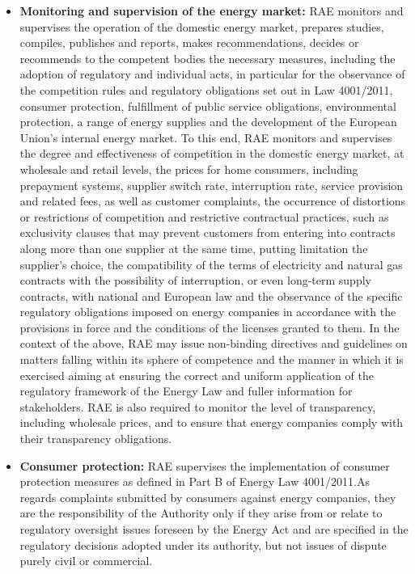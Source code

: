 \begin{itemize}
\item{\textbf{Monitoring and supervision of the energy market:}}
RAE monitors and supervises the operation of the domestic energy market, prepares studies, compiles, publishes and reports, makes recommendations, decides or recommends to the competent bodies the necessary measures, including the adoption of regulatory and individual acts, in particular for the observance of the competition rules and regulatory obligations set out in Law 4001/2011, consumer protection, fulfillment of public service obligations, environmental protection, a range of energy supplies and the development of the European Union's internal energy market. To this end, RAE monitors and supervises the degree and effectiveness of competition in the domestic energy market, at wholesale and retail levels, the prices for home consumers, including prepayment systems, supplier switch rate, interruption rate, service provision and related fees, as well as customer complaints, the occurrence of distortions or restrictions of competition and restrictive contractual practices, such as exclusivity clauses that may prevent customers from entering into contracts along more than one supplier at the same time, putting limitation the supplier’s choice, the compatibility of the terms of electricity and natural gas contracts with the possibility of interruption, or even long-term supply contracts, with national and European law and the observance of the specific regulatory obligations imposed on energy companies in accordance with the provisions in force and the conditions of the licenses granted to them. In the context of the above, RAE may issue non-binding directives and guidelines on matters falling within its sphere of competence and the manner in which it is exercised aiming at ensuring the correct and uniform application of the regulatory framework of the Energy Law and fuller information for stakeholders. RAE is also required to monitor the level of transparency, including wholesale prices, and to ensure that energy companies comply with their transparency obligations.
\item{\textbf{Consumer protection:}}
RAE supervises the implementation of consumer protection measures as defined in Part B of Energy Law 4001/2011.As regards complaints submitted by consumers against energy companies, they are the responsibility of the Authority only if they arise from or relate to regulatory oversight issues foreseen by the Energy Act and are specified in the regulatory decisions adopted under its authority, but not issues of dispute purely civil or commercial.

\end{itemize}
